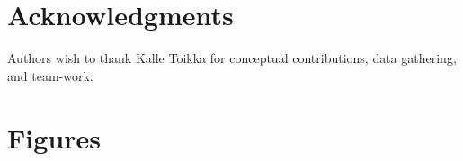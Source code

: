 \documentclass{frontierstyle/frontiersSCNS}
\begin{document}
\section*{Acknowledgments}
Authors wish to thank Kalle Toikka for conceptual contributions, data gathering, and team-work.




\section*{Figures}
\end{document}
